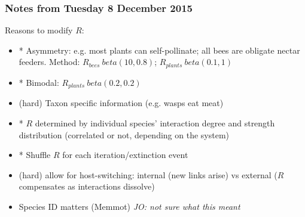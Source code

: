 \documentclass[12pt]{article}
\begin{document}
\subsubsection*{Notes from Tuesday 8 December 2015}
Reasons to modify $R$:
\begin{itemize}
	\item * Asymmetry: e.g. most plants can self-pollinate; all bees are obligate nectar feeders. Method: $R_{bees} ~ beta(10,0.8)$; $R_{plants} ~ beta(0.1,1)$
	\item * Bimodal: $R_{plants} ~ beta(0.2,0.2)$
	\item (hard) Taxon specific information (e.g. wasps eat meat)
	\item * $R$ determined by individual species' interaction degree and strength distribution (correlated or not, depending on the system)
	\item * Shuffle $R$ for each iteration/extinction event
	\item (hard) allow for host-switching: internal (new links arise) vs external ($R$ compensates as interactions dissolve)
	\item Species ID matters (Memmot) \textit{JO: not sure what this meant}
\end{itemize}
\end{document}
